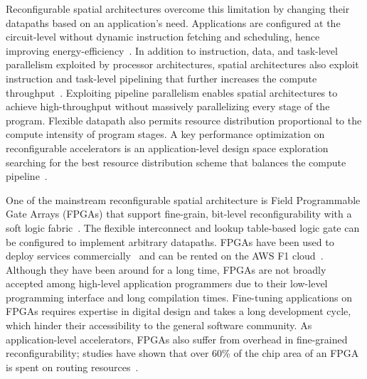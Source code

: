 Reconfigurable spatial architectures overcome this limitation by changing their datapaths based on
an application's need.
Applications are configured at the circuit-level without dynamic instruction fetching and scheduling,
hence improving energy-efficiency~\cite{calhoun,fpgaPower}.
In addition to instruction, data, and task-level parallelism exploited by processor architectures,
spatial architectures also exploit instruction and task-level pipelining that further increases the compute throughput~\cite{spatial-computation}.
Exploiting pipeline parallelism enables spatial architectures to achieve high-throughput
without massively parallelizing every stage of the program.
Flexible datapath also permits resource distribution proportional to the compute intensity of
program stages.
A key performance optimization on reconfigurable accelerators is an application-level design space
exploration 
searching for the best resource distribution scheme that balances the compute pipeline~\cite{dse_koeplinger}.

One of the mainstream reconfigurable spatial architecture is 
Field Programmable Gate Arrays (FPGAs) that support fine-grain, 
bit-level reconfigurability with a soft logic fabric~\cite{fpga-survey}.
The flexible interconnect and lookup table-based logic gate can be configured to implement arbitrary
datapaths.
FPGAs have been used to deploy services commercially~\cite{microsoft, baidu, deephi} and can be rented on the AWS F1 cloud~\cite{aws}. 
Although they have been around for a long time, FPGAs are not broadly accepted among high-level
application programmers due to their low-level programming interface and long compilation times.
Fine-tuning applications on FPGAs requires expertise in digital design and takes a long development cycle, which hinder their accessibility to the general software community.
As application-level accelerators, FPGAs also suffer from overhead in fine-grained reconfigurability; 
studies have shown that over 60\% of the chip area of an FPGA is spent on routing resources~\cite{fpgaSurvey, calhoun, fpgaPower}. 


